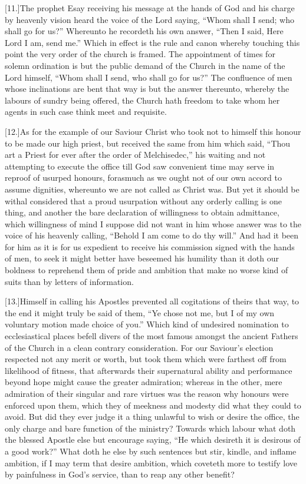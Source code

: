 [11.]The prophet Esay receiving his message at the hands of God and his charge by heavenly vision heard the voice of the Lord saying, “Whom shall I send; who shall go for us?” Whereunto he recordeth his own answer, “Then I said, Here Lord I am, send me.” Which in effect is the rule and canon whereby touching this point the very order of the church is framed. The appointment of times for solemn ordination is but the public demand of the Church in the name of the Lord himself, “Whom shall I send, who shall go for us?” The confluence of men whose inclinations are bent that way is but the answer thereunto, whereby the labours of sundry being offered, the Church hath freedom to take whom her agents in such case think meet and requisite.

[12.]As for the example of our Saviour Christ who took not to himself this honour to be made our high priest, but received the same from him which said, “Thou art a Priest for ever after the order of Melchisedec,” his waiting and not attempting to execute the office till God saw convenient time may serve in reproof of usurped honours, forasmuch as we ought not of our own accord to assume dignities, whereunto we are not called as Christ was. But yet it should be withal considered that a proud usurpation without any orderly calling is one thing, and another the bare declaration of willingness to obtain admittance, which willingness of mind I suppose did not want in him whose answer was to the voice of his heavenly calling, “Behold I am come to do thy will.” And had it been for him as it is for us expedient to receive his commission signed with the hands of men, to seek it might better have beseemed his humility than it doth our boldness to reprehend them of pride and ambition that make no worse kind of suits than by letters of information.




[13.]Himself in calling his Apostles prevented all cogitations of theirs that way, to the end it might truly be said of them, “Ye chose not me, but I of my own voluntary motion made choice of you.” Which kind of undesired nomination to ecclesiastical places befell divers of the most famous amongst the ancient Fathers of the Church in a clean contrary consideration. For our Saviour’s election respected not any merit or worth, but took them which were farthest off from likelihood of fitness, that afterwards their supernatural ability and performance beyond hope might cause the greater admiration; whereas in the other, mere admiration of their singular and rare virtues was the reason why honours were enforced upon them, which they of meekness and modesty did what they could to avoid. But did they ever judge it a thing unlawful to wish or desire the office, the only charge and bare function of the ministry? Towards which labour what doth the blessed Apostle else but encourage saying, “He which desireth it is desirous of a good work?” What doth he else by such sentences but stir, kindle, and inflame ambition, if I may term that desire ambition, which coveteth more to testify love by painfulness in God’s service, than to reap any other benefit?

